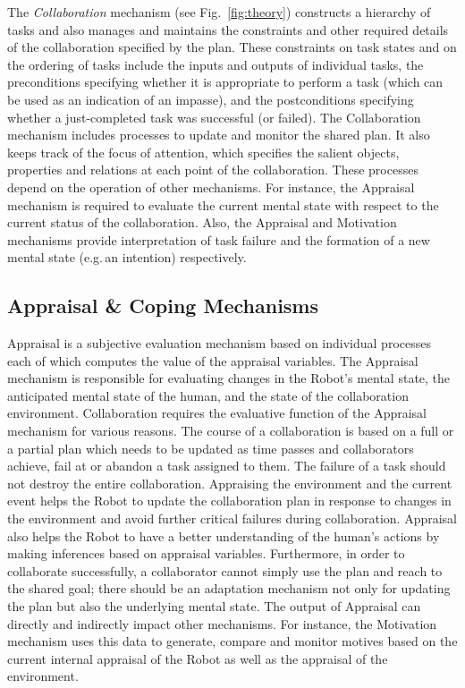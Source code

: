 The \textit{Collaboration} mechanism (see Fig.~\ref{fig:theory}) constructs
a hierarchy of tasks and also manages and maintains the constraints and other
required details of the collaboration specified by the plan. These constraints
on task states and on the ordering of tasks include the inputs and outputs of
individual tasks, the preconditions specifying whether it is appropriate to
perform a task (which can be used as an indication of an impasse), and the
postconditions specifying whether a just-completed task was successful (or
failed). The Collaboration mechanism includes processes to update and monitor
the shared plan. It also keeps track of the focus of attention, which specifies
the salient objects, properties and relations at each point of the
collaboration. These processes depend on the operation of other mechanisms. For
instance, the Appraisal mechanism is required to evaluate the current mental
state with respect to the current status of the collaboration. Also, the
Appraisal and Motivation mechanisms provide interpretation of task failure and
the formation of a new mental state (e.g.\,an intention) respectively.

\subsection{Appraisal \& Coping Mechanisms}
\label{sec:appraisal-coping-mech}

Appraisal is a subjective evaluation mechanism based on individual processes
each of which computes the value of the appraisal variables. The Appraisal
mechanism is responsible for evaluating changes in the Robot's mental state, the
anticipated mental state of the human, and the state of the collaboration
environment. Collaboration requires the evaluative function of the Appraisal
mechanism for various reasons. The course of a collaboration is based on a full
or a partial plan which needs to be updated as time passes and collaborators
achieve, fail at or abandon a task assigned to them. The failure of a task
should not destroy the entire collaboration. Appraising the environment and the
current event helps the Robot to update the collaboration plan in response to
changes in the environment and avoid further critical failures during
collaboration. Appraisal also helps the Robot to have a better understanding of
the human's actions by making inferences based on appraisal variables.
Furthermore, in order to collaborate successfully, a collaborator cannot simply
use the plan and reach to the shared goal; there should be an adaptation
mechanism not only for updating the plan but also the underlying mental state.
The output of Appraisal can directly and indirectly impact other mechanisms. For
instance, the Motivation mechanism uses this data to generate, compare and
monitor motives based on the current internal appraisal of the Robot as well as
the appraisal of the environment. 

